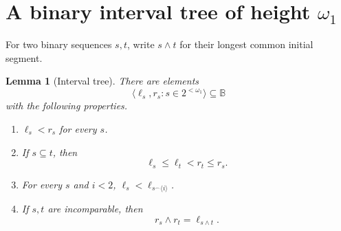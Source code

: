 \documentclass[11pt]{article}
\newtheorem{lemma}[theorem]{Lemma}
\theoremstyle{definition}
\theoremstyle{remark}
\newcommand{\B}{\mathbb B}
\newcommand{\concat}{\mathbin{{}^\frown}}
\begin{document}
\section{A binary interval tree of height \(\omega_1\)}

For two binary sequences \(s,t\), write \(s\wedge t\) for their longest common
initial segment.

\begin{lemma}[Interval tree]\label{lem:tree}
There are elements
\[
  \langle \ell_s,r_s:s\in2^{<\omega_1}\rangle
  \subseteq\B
\]
with the following properties.
\begin{enumerate}[label=\textup{(\roman*)}]
\item \(\ell_s<r_s\) for every \(s\).
\item If \(s\subseteq t\), then
\[
  \ell_s\leq\ell_t<r_t\leq r_s.
\]
\item For every \(s\) and \(i<2\),
\(\ell_s<\ell_{s\concat\langle i\rangle}\).
\item If \(s,t\) are incomparable, then
\[
  r_s\wedge r_t=\ell_{s\wedge t}.
\]
\end{enumerate}
\end{lemma}
\end{document}
